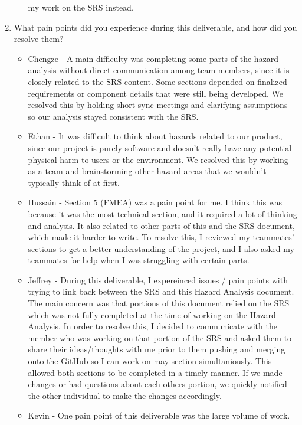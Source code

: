 \documentclass{article}
\begin{document}
\begin{enumerate}
\begin{itemize}
        my work on the SRS instead.
    \end{itemize} 
    \item What pain points did you experience during this deliverable, and how
    did you resolve them?
    \begin{itemize}
        \item Chengze - A main difficulty was completing some parts of the hazard analysis 
        without direct communication among team members, since it is closely related to the 
        SRS content. Some sections depended on finalized requirements or component details 
        that were still being developed. We resolved this by holding short sync meetings and 
        clarifying assumptions so our analysis stayed consistent with the SRS.
        \item Ethan - It was difficult to think about hazards related to our
          product, since our project is purely software and doesn't really have
          any potential physical harm to users or the environment. We resolved
          this by working as a team and brainstorming other hazard areas that
          we wouldn't typically think of at first.
        \item Hussain - Section 5 (FMEA) was a pain point for me. I think this was
        because it was the most technical section, and it required a lot of
        thinking and analysis. It also related to other parts of this and the SRS
        document, which made it harder to write. To resolve this, I reviewed my 
        teammates' sections to get a better understanding of the project, and I also
        asked my teammates for help when I was struggling with certain parts.
        \item Jeffrey - During this deliverable, I expereinced issues / pain points
        with trying to link back between the SRS and this Hazard Analysis document. 
        The main concern was that portions of this document relied on the SRS which
        was not fully completed at the time of working on the Hazard Analysis.
        In order to resolve this, I decided to communicate with the member who was
        working on that portion of the SRS and asked them to share their ideas/thoughts
        with me prior to them pushing and merging onto the GitHub so I can work on may
        section simultaniously. This allowed both sections to be completed in a timely
        manner. If we made changes or had questions about each others portion, we 
        quickly notified the other individual to make the changes accordingly.
        \item Kevin - One pain point of this deliverable was the large volume of work. 

\end{itemize}
\end{enumerate}
\end{document}
